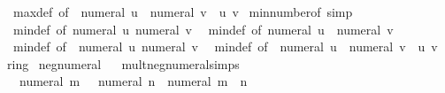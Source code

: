 \begin{isabellebody}
\ \ max{\isacharunderscore}{\kern0pt}def\ {\isacharbrackleft}{\kern0pt}of\ {\isachardoublequoteopen}{\isacharminus}{\kern0pt}\ numeral\ u{\isachardoublequoteclose}\ {\isachardoublequoteopen}{\isacharminus}{\kern0pt}\ numeral\ v{\isachardoublequoteclose}{\isacharbrackright}{\kern0pt}\ \ u\ v\isanewline
\isanewline
{}\isamarkupfalse%
\ min{\isacharunderscore}{\kern0pt}number{\isacharunderscore}{\kern0pt}of\ {\isacharbrackleft}{\kern0pt}simp{\isacharbrackright}{\kern0pt}\ {\isacharequal}{\kern0pt}\isanewline
\ \ min{\isacharunderscore}{\kern0pt}def\ {\isacharbrackleft}{\kern0pt}of\ {\isachardoublequoteopen}numeral\ u{\isachardoublequoteclose}\ {\isachardoublequoteopen}numeral\ v{\isachardoublequoteclose}{\isacharbrackright}{\kern0pt}\isanewline
\ \ min{\isacharunderscore}{\kern0pt}def\ {\isacharbrackleft}{\kern0pt}of\ {\isachardoublequoteopen}numeral\ u{\isachardoublequoteclose}\ {\isachardoublequoteopen}{\isacharminus}{\kern0pt}\ numeral\ v{\isachardoublequoteclose}{\isacharbrackright}{\kern0pt}\isanewline
\ \ min{\isacharunderscore}{\kern0pt}def\ {\isacharbrackleft}{\kern0pt}of\ {\isachardoublequoteopen}{\isacharminus}{\kern0pt}\ numeral\ u{\isachardoublequoteclose}\ {\isachardoublequoteopen}numeral\ v{\isachardoublequoteclose}{\isacharbrackright}{\kern0pt}\isanewline
\ \ min{\isacharunderscore}{\kern0pt}def\ {\isacharbrackleft}{\kern0pt}of\ {\isachardoublequoteopen}{\isacharminus}{\kern0pt}\ numeral\ u{\isachardoublequoteclose}\ {\isachardoublequoteopen}{\isacharminus}{\kern0pt}\ numeral\ v{\isachardoublequoteclose}{\isacharbrackright}{\kern0pt}\ \ u\ v%
\isadelimdocument
%
\endisadelimdocument
%
\isatagdocument
%
\isamarkuptrue%
%
\endisatagdocument
{\isafolddocument}%
%
\isadelimdocument
%
\endisadelimdocument
{}\isamarkupfalse%
\ ring{\isacharunderscore}{\kern0pt}{}\isanewline
{}\isanewline
\isanewline
{}\isamarkupfalse%
\ neg{\isacharunderscore}{\kern0pt}numeral%
\isadelimproof
\ %
\endisadelimproof
%
\isatagproof
\isacommand{{\isachardot}{\kern0pt}{\isachardot}{\kern0pt}}\isamarkupfalse%
%
\endisatagproof
{\isafoldproof}%
%
\isadelimproof
%
\endisadelimproof
\isanewline
\isanewline
{}\isamarkupfalse%
\ mult{\isacharunderscore}{\kern0pt}neg{\isacharunderscore}{\kern0pt}numeral{\isacharunderscore}{\kern0pt}simps{\isacharcolon}{\kern0pt}\isanewline
\ \ {\isachardoublequoteopen}{\isacharminus}{\kern0pt}\ numeral\ m\ {\isacharasterisk}{\kern0pt}\ {\isacharminus}{\kern0pt}\ numeral\ n\ {\isacharequal}{\kern0pt}\ numeral\ {\isacharparenleft}{\kern0pt}m\ {\isacharasterisk}{\kern0pt}\ n{\isacharparenright}{\kern0pt}{\isachardoublequoteclose}\isanewline

\end{isabellebody}
